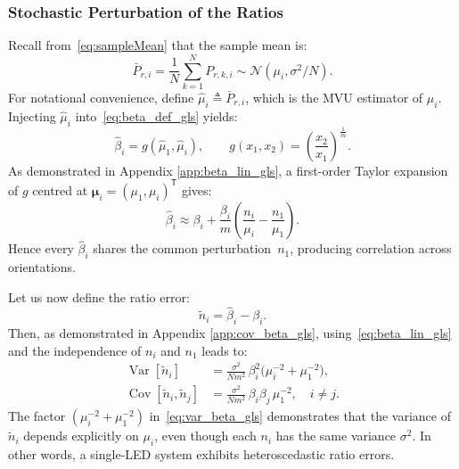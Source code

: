 \documentclass[journal]{IEEEtran}
\begin{document}
\subsubsection{Stochastic Perturbation of the Ratios}
Recall from~\eqref{eq:sampleMean} that the sample mean is:
\begin{equation}
\bar P_{r,i}=\frac1N\sum_{k=1}^NP_{r,k,i}
 \sim\mathcal N(\mu_i,\sigma^{2}/N).
\end{equation}
For notational convenience, define $\hat{\mu}_i \triangleq \bar P_{r,i}$, which is the MVU estimator of $\mu_i$.
Injecting $\hat\mu_i$ into~\eqref{eq:beta_def_gls} yields:
\begin{equation}
  \hat\beta_i
  =g(\hat\mu_1,\hat\mu_i),
  \qquad
  g(x_1,x_2)=\left(\frac{x_2}{x_1}\right)^{\frac{1}{m}}.
\end{equation}
As demonstrated in Appendix \ref{app:beta_lin_gls}, a first-order Taylor expansion of $g$ centred at
$\boldsymbol\mu_i=(\mu_1,\mu_i)^{\mathsf T}$ gives:
\begin{equation}
  \hat\beta_i
  \approx
  \beta_i
  +\frac{\beta_i}{m}
   \!\left(\frac{n_i}{\mu_i}-\frac{n_1}{\mu_1}\right).
  \label{eq:beta_lin_gls}
\end{equation}
Hence every $\hat\beta_i$ shares the common perturbation~$n_1$,
producing correlation across orientations.


Let us now define the ratio error:
\begin{equation}
\tilde{n}_i=\hat\beta_i-\beta_i.
\label{eq:ratio_error}
\end{equation}
Then, as demonstrated in Appendix \ref{app:cov_beta_gls}, using~\eqref{eq:beta_lin_gls}
and the independence of $n_i$ and $n_1$ leads to:
\begin{align}
  \operatorname{Var}[\tilde{n}_i]
  &=
  \frac{\sigma^{2}}{Nm^{2}}\,
  \beta_i^{2}\bigl(\mu_i^{-2}+\mu_1^{-2}\bigr),
  \label{eq:var_beta_gls}\\
  \operatorname{Cov}[\tilde{n}_i,\tilde{n}_j]
  &=
  \frac{\sigma^{2}}{Nm^{2}}\,
  \beta_i\beta_j\,\mu_1^{-2},
  \quad i\neq j.
  \label{eq:cov_beta_gls}
\end{align}
The factor $(\mu_i^{-2} + \mu_1^{-2})$ in~\eqref{eq:var_beta_gls}
demonstrates that the variance of $\tilde{n}_i$ depends explicitly on
$\mu_i$, even though each $n_i$ has the same variance
$\sigma^2$.  In other words, a single‐LED system exhibits
heteroscedastic ratio errors.
\end{document}
